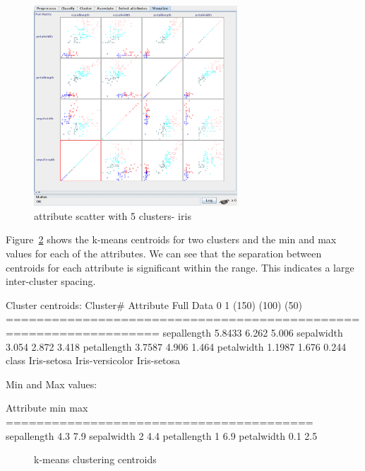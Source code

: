 \documentclass{sig-alternate}
\begin{document}
\begin{figure}[!htbp]
    \centering
    \includegraphics[width=3in]{part2/iris/attribute-scatter-cluster-5.pdf}
    \caption{attribute scatter with 5 clusters- iris\label{iris-attr-scatter-cluster-5}}
\end{figure} 

Figure~\ref{iris-k-means-centroids} shows the k-means centroids for two clusters and the min and max values for each of the attributes. We can see that the separation between centroids for each attribute is significant within the range. This indicates a large inter-cluster spacing.

\scriptsize
\begin{verbbox}
Cluster centroids:
                                          Cluster#
Attribute                Full Data               0               1
                             (150)           (100)            (50)
==================================================================
sepallength                 5.8433           6.262           5.006
sepalwidth                   3.054           2.872           3.418
petallength                 3.7587           4.906           1.464
petalwidth                  1.1987           1.676           0.244
class                  Iris-setosa Iris-versicolor     Iris-setosa


Min and Max values:

Attribute                
                      min            max
========================================
sepallength           4.3            7.9  
sepalwidth              2            4.4
petallength             1            6.9
petalwidth            0.1            2.5

\end{verbbox}
\normalsize

\begin{figure}[!htbp]
    \centering
    \theverbbox
    \caption{k-means clustering centroids\label{iris-k-means-centroids}}
\end{figure}
\end{document}
